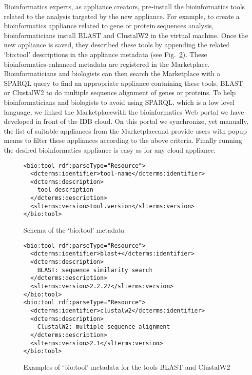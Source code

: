 Bioinformatics experts, as appliance creators, pre-install the bioinformatics tools related to
the analysis targeted by the new appliance. For example, to create a bioinformatics appliance related to gene or protein sequences analysis, bioinformaticians install BLAST and ClustalW2 in the virtual machine. Once the new appliance is saved, they described these tools by appending the related `bio:tool' descriptions in the appliance metadata (see Fig.~\ref{fig:biotool-exemple}). These
bioinformatics-enhanced metadata are registered in the
Marketplace\@. Bioinformaticians and biologists can then search
the Marketplace with a SPARQL query to find an appropriate appliance containing these  tools, BLAST or ClustalW2 to do multiple sequence alignment of genes or proteins. To help bioinformaticians and biologists to avoid using SPARQL, which is a low level language, we linked the Marketplace\@ with the bioinformatics Web portal we have developed in front of the IDB cloud. On this portal we synchronize, yet manually, the list of suitable appliances  from the Marketplace\@ and provide users with popup menus to filter these appliances according to the above criteria. Finally running the desired bioinformatics appliance is easy
as for any cloud appliance. 


\begin{figure}
\tiny
 \begin{center}
    \begin{verbatim}
<bio:tool rdf:parseType="Resource">
  <dcterms:identifier>tool-name</dcterms:identifier>
  <dcterms:description>
    tool description
  </dcterms:description>
  <slterms:version>tool.version</slterms:version>
</bio:tool>
    \end{verbatim}
  \end{center}
 \caption{Schema of the `bio:tool' metadata}
 \label{fig:biotool-schema}
\end{figure}


\begin{figure}
\tiny
 \begin{center}
    \begin{verbatim}
<bio:tool rdf:parseType="Resource">
  <dcterms:identifier>blast+</dcterms:identifier>
  <dcterms:description>
    BLAST: sequence similarity search
  </dcterms:description>
  <slterms:version>2.2.27</slterms:version>
</bio:tool>
<bio:tool rdf:parseType="Resource">
  <dcterms:identifier>clustalw2</dcterms:identifier>
  <dcterms:description>
    ClustalW2: multiple sequence alignment
  </dcterms:description>
  <slterms:version>2.1</slterms:version>
</bio:tool>
    \end{verbatim}
  \end{center}
 \caption{Examples of `bio:tool' metadata for the tools BLAST and ClustalW2}
 \label{fig:biotool-exemple}
\end{figure}
